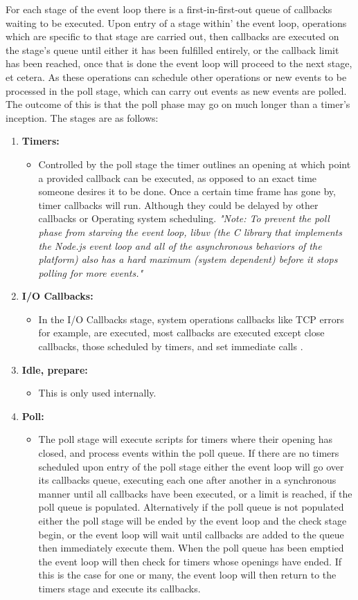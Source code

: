 \noindent For each stage of the event loop there is a first-in-first-out queue of callbacks waiting to be executed. Upon entry of a stage within' the event loop, operations which are specific to that stage are carried out, then callbacks are executed on the stage's queue until either it has been fulfilled entirely, or the callback limit has been reached, once that is done the event loop will proceed to the next stage, et cetera\cite{node}. As these operations can schedule other operations or new events to be processed in the poll stage, which can carry out events as new events are polled. The outcome of this is that the poll phase may go on much longer than a timer's inception. The stages are as follows:
\begin{enumerate}
\item \textbf{Timers:}
	\begin{itemize}
	\item Controlled by the poll stage the timer outlines an opening at which point a provided callback can be executed, as opposed to an exact time someone desires it to be done. Once a certain time frame has gone by, timer callbacks will run. Although they could be delayed by other callbacks or Operating system scheduling. \emph{"Note: To prevent the poll phase from starving the event loop, libuv (the C library that implements the Node.js event loop and all of the asynchronous behaviors of the platform) also has a hard maximum (system dependent) before it stops polling for more events."}\cite{node}
	\end{itemize}
\item \textbf{I/O Callbacks:}
	\begin{itemize}
	\item In the I/O Callbacks stage, system operations callbacks like TCP errors for example, are executed, most callbacks are executed except close callbacks, those scheduled by timers, and set immediate calls .\cite{node}
	\end{itemize}
\item \textbf{Idle, prepare:}
	\begin{itemize}
	\item This is only used internally.\cite{node}
	\end{itemize}
\item \textbf{Poll:}
	\begin{itemize}
	\item The poll stage will execute scripts for timers where their opening has closed, and process events within the poll queue. If there are no timers scheduled upon entry of the poll stage either the event loop will go over its  callbacks queue, executing each one after another in a synchronous manner until all callbacks have been executed, or a limit is reached, if the poll queue is populated. Alternatively if the poll queue is not populated either the poll stage will be ended by the event loop and the check stage begin, or the event loop will wait until callbacks are added to the queue then immediately execute them.\cite{node} When the poll queue has been emptied the event loop will then check for timers whose openings have ended. If this is the case for one or many, the event loop will then return to the timers stage and execute its callbacks.

\end{itemize}
\end{enumerate}
